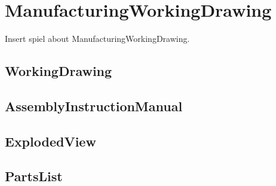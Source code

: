 

\chapter{ManufacturingWorkingDrawing}
Insert spiel about ManufacturingWorkingDrawing.

\section{WorkingDrawing}


\section{AssemblyInstructionManual}


\section{ExplodedView}


\section{PartsList}

